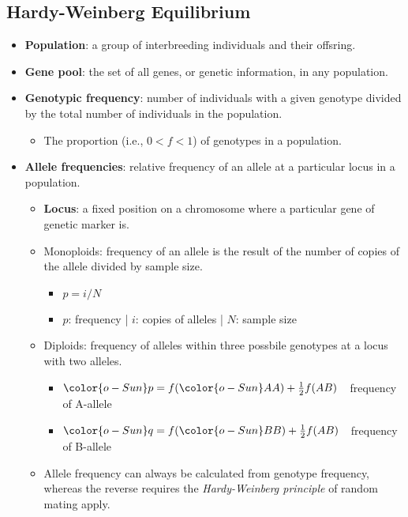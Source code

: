 \documentclass[12pt,a4paper]{article}
\begin{document}
\subsection{Hardy-Weinberg Equilibrium}
\begin{itemize}
    \item \textbf{Population}: a group of interbreeding individuals and their offsring.
    \item \textbf{Gene pool}: the set of all genes, or genetic information, in any population.
    \item \textbf{Genotypic frequency}: number of individuals with a given genotype divided by the total number of individuals in the population.
        \begin{itemize}
            \item The proportion (i.e., \(0<f<1\)) of genotypes in a population.
        \end{itemize}
    \item \textbf{Allele frequencies}: relative frequency of an allele at a particular locus in a population.
        \begin{itemize}
            \item \textbf{Locus}: a fixed position on a chromosome where a particular gene of genetic marker is.
            \item Monoploids: frequency of an allele is the result of the number of copies of the allele divided by sample size.
                \begin{itemize}
                    \item \(p=i/N\)
                    \item \(p\): frequency |  \(i\): copies of alleles |  \(N\): sample size
                \end{itemize}
            \item Diploids: frequency of alleles within three possbile genotypes at a locus with two alleles.
                \begin{itemize}
                    \item \({\color{o-Sun}p}=f({\color{o-Sun}AA})+\frac{1}{2}f(AB)\)~~frequency of {\color{o-Sun}A}-allele 
                    \item \({\color{o-Sun}q}=f({\color{o-Sun}BB})+\frac{1}{2}f(AB)\)~~frequency of {\color{o-Sun}B}-allele
                \end{itemize}
            \item Allele frequency can always be calculated from genotype frequency, whereas the reverse requires the \textit{Hardy-Weinberg principle} of random mating apply.

\end{itemize}
\end{itemize}
\end{document}
